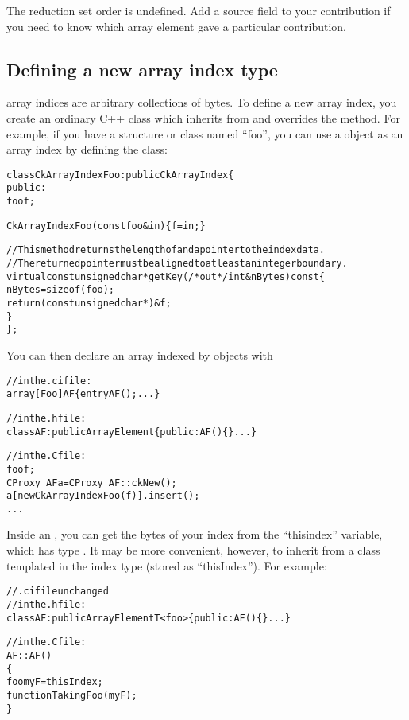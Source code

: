 The reduction set order is undefined.  Add a source field to your contribution
if you need to know which array element gave a particular contribution.

\subsection{Defining a new array index type}

\charmpp{} array indices are arbitrary collections of bytes.
To define a new array index, you create an ordinary C++ class 
which inherits from  and overrides the  method.  
For example, if you have a structure or class named ``foo'', you 
can use a  object as an array index by defining the class:

\begin{alltt}
class CkArrayIndexFoo:public CkArrayIndex \{
public:
    foo f;

    CkArrayIndexFoo(const foo \&in) \{f=in;\}

    //This method returns the length of and a pointer to the index data.
    //The returned pointer must be aligned to at least an integer boundary.
    virtual const unsigned char *getKey(/*out*/ int \&nBytes) const \{
      	nBytes=sizeof(foo);
        return (const unsigned char *)\&f;
    \}
\};
\end{alltt}

You can then declare an array indexed by  objects with

\begin{alltt}
//in the .ci file:
array [Foo] AF \{ entry AF(); ... \}

//in the .h file:
class AF:public ArrayElement \{ public: AF() \{\} ... \}

//in the .C file:
    foo f;
    CProxy_AF a=CProxy_AF::ckNew();
    a[new CkArrayIndexFoo(f)].insert();
    ...
\end{alltt}

Inside an , you can get the bytes of your index
from the ``thisindex'' variable, which has type .  
It may be more convenient, however, to inherit from  a 
class templated in the index type  (stored as ``thisIndex'').
For example:

\begin{alltt}
//.ci file unchanged
//in the .h file:
class AF:public ArrayElementT<foo> \{public: AF() \{\} ... \}

//in the .C file:
AF::AF()
\{
    foo myF=thisIndex;
    functionTakingFoo(myF);
\}
\end{alltt}


